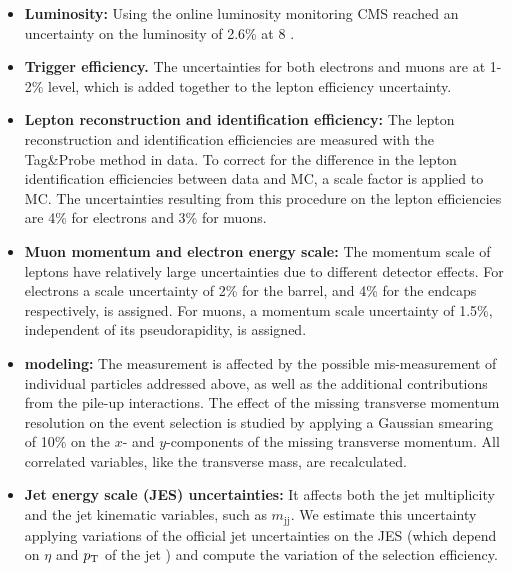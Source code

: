 \begin{itemize}
\item {\bf Luminosity:} Using the online luminosity monitoring CMS
  reached an uncertainty on the luminosity of 2.6\% at 8 \TeV.

\item {\bf Trigger efficiency.} The uncertainties for both electrons and muons
  are at 1-2\% level, which is added together to the lepton efficiency uncertainty.

\item {\bf Lepton reconstruction and identification efficiency:} 
   The lepton reconstruction and identification efficiencies are measured with the Tag\&Probe
   method in data. To correct for the difference in the lepton identification
   efficiencies between data and MC, a scale factor is applied to MC.
   The uncertainties resulting from this procedure on the lepton efficiencies are 4\% for electrons and 3\% for muons.

\item {\bf Muon momentum and electron energy scale:} 
  The momentum scale of leptons have relatively large uncertainties due to different detector effects. 
  For electrons a scale  uncertainty of 2\% for the barrel, and 4\% for the endcaps respectively, 
  is assigned. 
  For muons, a momentum scale uncertainty of 1.5\%, independent of its pseudorapidity,  is assigned. 

\item {\bf {\boldmath \MET} modeling:} 
  The \MET measurement is affected by the possible mis-measurement of 
  individual particles addressed above, as well as the additional contributions 
  from the pile-up interactions. 
  The effect of the missing transverse momentum resolution on the event selection
  is studied by applying a Gaussian smearing of 10\% on the $x$- and
  $y$-components of the missing transverse momentum. All correlated variables,
  like the transverse mass, are recalculated. 

\item {\bf Jet energy scale (JES) uncertainties:} 
  It affects both the jet multiplicity and the 
  jet kinematic variables, such as $m_\mathrm{jj}$.
  We estimate this uncertainty applying variations of the official
  jet uncertainties on the JES (which depend on $\eta$ and $p_\mathrm{T}$ of the jet 
   \cite{JEC2012}) and
  compute the variation of the selection efficiency. %


\end{itemize}
